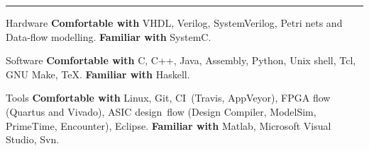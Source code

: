\vspace{-3mm}
\rule{\textwidth}{0.5pt}\vspace{-1mm}

\vspace{-1mm}
\begin{cvskills}

\cvskill
{Hardware}
{\textbf{Comfortable with} VHDL, Verilog, SystemVerilog, Petri nets and 
Data-flow modelling. \textbf{Familiar with} SystemC.}

\cvskill
{Software}
{\textbf{Comfortable with} C, C++, Java, Assembly, Python, Unix shell, Tcl, 
GNU Make, TeX. \textbf{Familiar with} Haskell.}

\cvskill
{Tools}
{\textbf{Comfortable with} Linux, Git, CI~(Travis, AppVeyor), FPGA 
flow (Quartus and Vivado), ASIC design~flow (Design Compiler, ModelSim, 
PrimeTime, Encounter), Eclipse. \textbf{Familiar with} Matlab, 
Microsoft Visual Studio, Svn.}

\end{cvskills}

